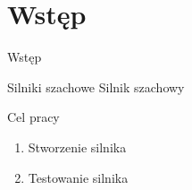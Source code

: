\section{Wstęp}\label{sec:wstep}

\begin{frame}{Wstęp}

    \begin{block}{Silniki szachowe}
        Silnik szachowy
    \end{block}

    \begin{block}{Cel pracy}
        \begin{enumerate}
            \item Stworzenie silnika
            \item Testowanie silnika
        \end{enumerate}
    \end{block}

\end{frame}